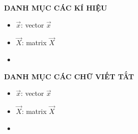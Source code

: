 \newpage	
\vspace{5cm} 

\begin{center}
	{
		\fontsize{16pt}{1}\selectfont
		\textbf{DANH MỤC CÁC KÍ HIỆU}
	}
\end{center} 

\begin{itemize}
		\item $\vec{x}$: vector $\vec{x}$
		
		\item $\vec{X}$: matrix $\vec{X}$
		
		\item 
\end{itemize}




\newpage	
\vspace{5cm} 

\begin{center}
	{
		\fontsize{16pt}{1}\selectfont
		\textbf{DANH MỤC CÁC CHỮ VIẾT TẮT}
	}
\end{center} 
\begin{itemize}
	\item $\vec{x}$: vector $\vec{x}$
	
	\item $\vec{X}$: matrix $\vec{X}$
	
	\item 
\end{itemize}
